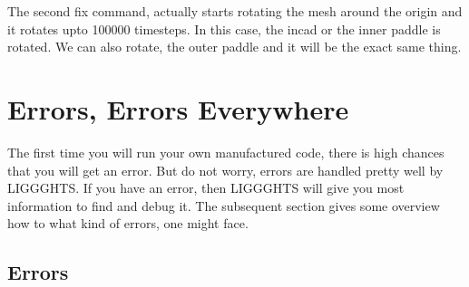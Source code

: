 \documentclass{tufte-book} %
\begin{document}
The second fix command, actually starts rotating the mesh around the origin and it rotates upto 100000 timesteps. In this case, the incad or the inner paddle is rotated. We can also rotate, the outer paddle and it will be the exact same thing. 

\section{Errors, Errors Everywhere}
The first time you will run your own manufactured code, there is high chances that you will get an error. But do not worry, errors are handled pretty well by LIGGGHTS. If you have an error, then LIGGGHTS will give you most information to find and debug it. The subsequent section gives some overview how to what kind of errors, one might face.
\subsection{Errors}
\end{document}
